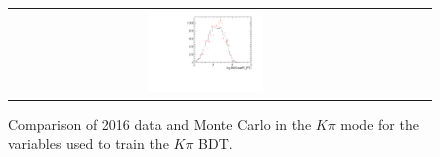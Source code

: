 \begin{figure}
\begin{tabular}{ccc}
\includegraphics[width=0.3\textwidth]{ANA_resources/Plots/Monte_carlo/data_vs_MC/Kpi/log10(KstarPi_PT)_2016.pdf} & & \\
\end{tabular}
\caption{Comparison of 2016 data and Monte Carlo in the $K\pi$ mode for the variables used to train the $K\pi$ BDT.}
\label{fig:data_vs_MC_Kpi_2016}
\end{figure}
